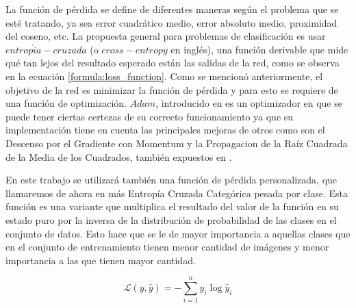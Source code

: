   La función de pérdida se define de diferentes maneras según el problema que se esté tratando, ya sea error cuadrático medio, error absoluto medio, proximidad del coseno, etc. La propuesta general para problemas de clasificación es usar \(entrop{\acute i}a-cruzada\) (o \(cross-entropy\) en inglés), una función derivable que mide qué tan lejos del resultado esperado están las salidas de la red, como se observa en la ecuación \ref{formula:loss_function}. Como se mencionó anteriormente, el objetivo de la red es minimizar la función de pérdida y para esto se requiere de una función de optimización. \(Adam\), introducido en \cite{kingma2014adam} es un optimizador en que se puede tener ciertas certezas de su correcto funcionamiento ya que su implementación tiene en cuenta las principales mejoras de otros como son el Descenso por el Gradiente con Momentum y la Propagacion de la Raíz Cuadrada de la Media de los Cuadrados, también expuestos en \cite{choi2019empirical}.
  
  En este trabajo se utilizará también una función de pérdida personalizada, que llamaremos de ahora en más Entropía Cruzada Categórica pesada por clase. Esta función es una variante que multiplica el resultado del valor de la función en su estado puro por la inversa de la distribución de probabilidad de las clases en el conjunto de datos. Esto hace que se le de mayor importancia a aquellas clases que en el conjunto de entrenamiento tienen menor cantidad de imágenes y menor importancia a las que tienen mayor cantidad.
  
  \begin{equation}\label{formula:custom_loss_function}
  \mathcal{L}(y, \hat{y})=-\sum_{i=1}^{n} y_{i} \log \hat{y}_{i}
  \end{equation}
  

